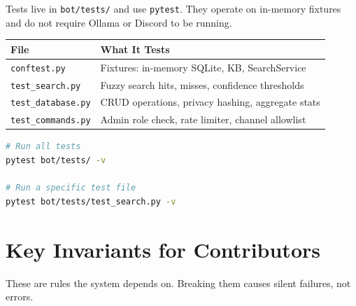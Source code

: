 \documentclass[12pt,letterpaper]{article}
\begin{document}
Tests live in \texttt{bot/tests/} and use \texttt{pytest}. They operate on
in-memory fixtures and do not require Ollama or Discord to be running.

\begin{center}
\begin{tabular}{ll}
\toprule
\textbf{File} & \textbf{What It Tests} \\
\midrule
\texttt{conftest.py} & Fixtures: in-memory SQLite, KB, SearchService \\
\texttt{test\_search.py} & Fuzzy search hits, misses, confidence thresholds \\
\texttt{test\_database.py} & CRUD operations, privacy hashing, aggregate stats \\
\texttt{test\_commands.py} & Admin role check, rate limiter, channel allowlist \\
\bottomrule
\end{tabular}
\end{center}

\begin{lstlisting}[language=bash]
# Run all tests
pytest bot/tests/ -v

# Run a specific test file
pytest bot/tests/test_search.py -v
\end{lstlisting}

\section{Key Invariants for Contributors}

These are rules the system depends on. Breaking them causes silent failures,
not errors.
\end{document}
